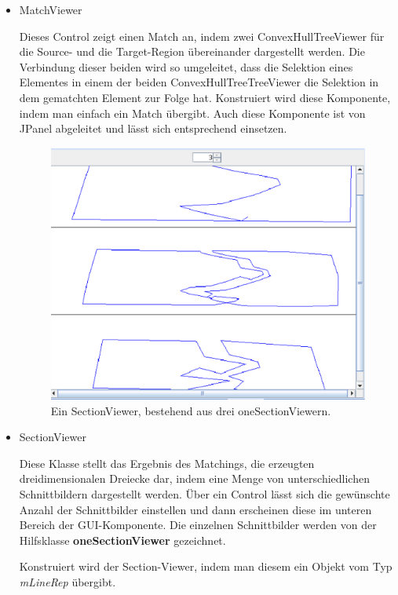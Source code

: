 \begin{itemize}
\item MatchViewer

Dieses Control zeigt einen Match an, indem zwei ConvexHullTreeViewer für die Source- und die Target-Region übereinander dargestellt werden. Die Verbindung dieser beiden wird so umgeleitet, dass die Selektion eines Elementes in einem der beiden ConvexHullTreeTreeViewer die Selektion in dem gematchten Element zur Folge hat. Konstruiert wird diese Komponente, indem man einfach ein Match übergibt. Auch diese Komponente ist von JPanel abgeleitet und lässt sich entsprechend einsetzen.

\begin{figure}
	\centering
	\includegraphics[scale=0.5]{Sectionviewer.eps}
	\caption{Ein SectionViewer, bestehend aus drei oneSectionViewern.}
	\label{fig:SectionViewer}
\end{figure}


\item SectionViewer

Diese Klasse stellt das Ergebnis des Matchings, die erzeugten dreidimensionalen Dreiecke dar, indem eine Menge von unterschiedlichen Schnittbildern dargestellt werden. Über ein Control lässt sich die gewünschte Anzahl der Schnittbilder einstellen und dann erscheinen diese im unteren Bereich der GUI-Komponente. Die einzelnen Schnittbilder werden von der Hilfsklasse  \textbf{oneSectionViewer} gezeichnet.

Konstruiert wird der Section-Viewer, indem man diesem ein Objekt vom Typ \textit{mLineRep} übergibt.



\end{itemize}

